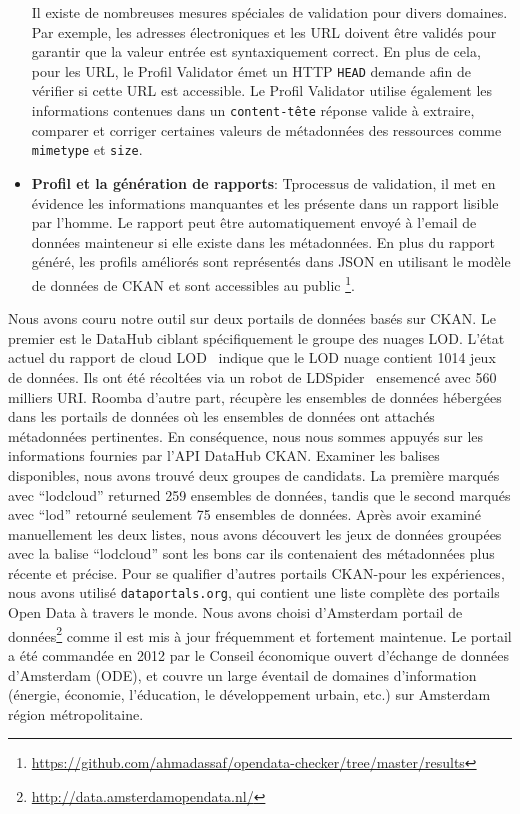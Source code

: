 \documentclass[a4paper,11pt,twoside]{ThesisStyle}
\begin{document}
\begin{itemize}
	Il existe de nombreuses mesures spéciales de validation pour divers domaines. Par exemple, les adresses électroniques et les URL doivent être validés pour garantir que la valeur entrée est syntaxiquement correct. En plus de cela, pour les URL, le Profil Validator émet un HTTP \texttt{HEAD} demande afin de vérifier si cette URL est accessible. Le Profil Validator utilise également les informations contenues dans un \texttt{content-tête} réponse valide à extraire, comparer et corriger certaines valeurs de métadonnées des ressources comme \texttt{mimetype} et \texttt{size}.
	\item \textbf{Profil et la génération de rapports}: Tprocessus de validation, il met en évidence les informations manquantes et les présente dans un rapport lisible par l'homme. Le rapport peut être automatiquement envoyé à l'email de données mainteneur si elle existe dans les métadonnées. En plus du rapport généré, les profils améliorés sont représentés dans JSON en utilisant le modèle de données de CKAN et sont accessibles au public \footnote{\url{https://github.com/ahmadassaf/opendata-checker/tree/master/results}}.
\end{itemize}

Nous avons couru notre outil sur deux portails de données basés sur CKAN. Le premier est le DataHub ciblant spécifiquement le groupe des nuages ​​LOD. L'état actuel du rapport de cloud LOD~\cite{Schmachtenberg: ISWC: 14} indique que le LOD nuage contient 1014 jeux de données. Ils ont été récoltées via un robot de LDSpider~\cite{Isele: ISWC: 10} ensemencé avec 560 milliers URI. Roomba d'autre part, récupère les ensembles de données hébergées dans les portails de données où les ensembles de données ont attachés métadonnées pertinentes. En conséquence, nous nous sommes appuyés sur les informations fournies par l'API DataHub CKAN. Examiner les balises disponibles, nous avons trouvé deux groupes de candidats. La première marqués avec ``lodcloud'' returned 259 ensembles de données, tandis que le second marqués avec ``lod'' retourné seulement 75 ensembles de données. Après avoir examiné manuellement les deux listes, nous avons découvert les jeux de données groupées avec la balise ``lodcloud'' sont les bons car ils contenaient des métadonnées plus récente et précise. Pour se qualifier d'autres portails CKAN-pour les expériences, nous avons utilisé \texttt{dataportals.org}, qui contient une liste complète des portails Open Data à travers le monde. Nous avons choisi d'Amsterdam portail de données\footnote{\url{http://data.amsterdamopendata.nl/}} comme il est mis à jour fréquemment et fortement maintenue. Le portail a été commandée en 2012 par le Conseil économique ouvert d'échange de données d'Amsterdam (ODE), et couvre un large éventail de domaines d'information (énergie, économie, l'éducation, le développement urbain, etc.) sur Amsterdam région métropolitaine.
\end{document}
